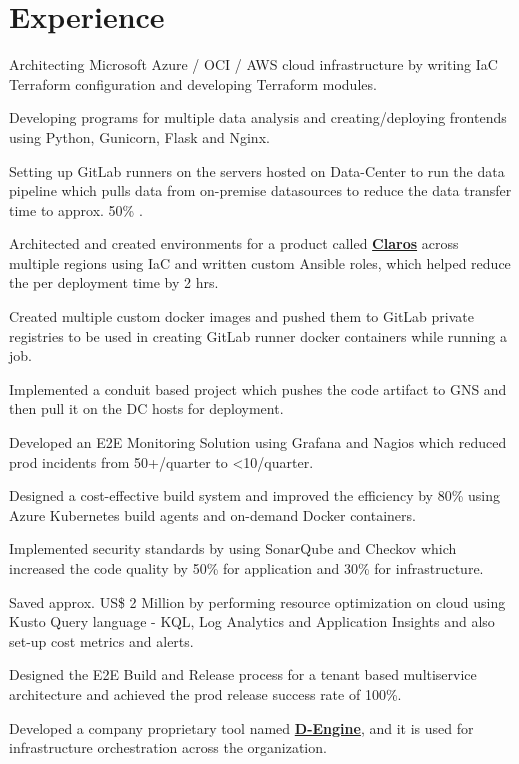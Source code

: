 \documentclass[a4paper]{deedy-resume-openfont}
\begin{document}
\begin{minipage}[t]{0.66\textwidth}
\section{Experience}
\vspace{\topsep} %
\begin{tightemize} %
\item Architecting Microsoft Azure / OCI / AWS cloud infrastructure by writing IaC Terraform configuration and developing Terraform modules.
\item Developing programs for multiple data analysis and creating/deploying frontends using Python, Gunicorn, Flask and Nginx.
\item Setting up GitLab runners on the servers hosted on Data-Center to run the data pipeline which pulls data from on-premise datasources to reduce the data transfer time to approx. 50\% .
\item Architected and created environments for a product called \href{https://www.hach.com/claros/overview#claros-video}{\bf Claros} across multiple regions using IaC and written custom Ansible roles, which helped reduce the per deployment time by 2 hrs.
\item Created multiple custom docker images and pushed them to GitLab private registries to be used in creating GitLab runner docker containers while running a job.
\item Implemented a conduit based project which pushes the code artifact to GNS and then pull it on the DC hosts for deployment.
\item Developed an E2E Monitoring Solution using Grafana and Nagios which reduced prod incidents from 50+/quarter to <10/quarter.
\item Designed a cost-effective build system and improved the efficiency by 80\% using Azure Kubernetes build agents and on-demand Docker containers.
\item Implemented security standards by using SonarQube and Checkov which increased the code quality by 50\% for application and 30\% for infrastructure.
\item Saved approx. US\$ 2 Million by performing resource optimization on cloud using Kusto Query language - KQL, Log Analytics and Application Insights and also set-up cost metrics and alerts.
\item Designed the E2E Build and Release process for a tenant based multiservice architecture and achieved the prod release success rate of 100\%.
\item Developed a company proprietary tool named \href{https://www.youtube.com/watch?v=YWLU2OU13tA}{\bf D-Engine}, and it is used for infrastructure orchestration across the organization.

\end{tightemize}
\end{minipage}
\end{document}

